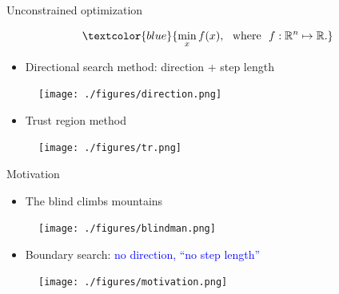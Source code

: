\documentclass{beamer}
\begin{document}
\begin{frame}{Unconstrained optimization}


\begin{align*}
	\textcolor{blue}{
	\min_x f(x),~~ \mbox{where}~~
f: \mathbb{R}^n \mapsto \mathbb{R}.
}
\end{align*}

\pause

\begin{itemize}
	\item Directional search method:  direction + step length 
\end{itemize}
\begin{figure}[!htbp]
	\centering
	  \texttt{[image: ./figures/direction.png]}
\end{figure}

\pause

\begin{itemize}
	\item Trust region method 
\end{itemize}
\begin{figure}[!htbp]
	\centering
	  \texttt{[image: ./figures/tr.png]}
\end{figure}


\end{frame}

\begin{frame}{Motivation}


\begin{itemize}
	\item The blind climbs mountains
\end{itemize}
\begin{figure}[!htbp]
	\centering
	  \texttt{[image: ./figures/blindman.png]}
\end{figure}

\pause

\begin{itemize}
	\item Boundary search: \textcolor{blue}{no direction, ``no step length''}
\end{itemize}
\begin{figure}[!htbp]
	\centering
	  \texttt{[image: ./figures/motivation.png]}
\end{figure}
\end{frame}
\end{document}
